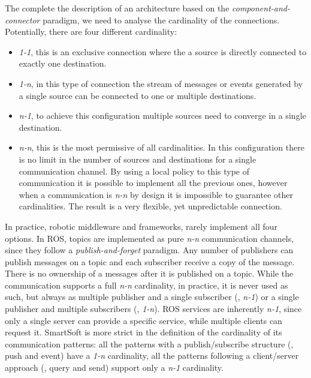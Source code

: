 The complete the description of an architecture based on the \textit{component-and-connector} paradigm, we need to analyse the cardinality of the connections. Potentially, there are four different cardinality:
\begin{itemize}
\item \textit{1-1}, this is an exclusive connection where the a source is directly connected to exactly one destination.
\item \textit{1-n}, in this type of connection the stream of messages or events generated by a single source can be connected to one or multiple destinations.
\item \textit{n-1}, to achieve this configuration multiple sources need to converge in a single destination.
\item \textit{n-n}, this is the most permissive of all cardinalities. In this configuration there is no limit in the number of sources and destinations for a single communication channel. By using a local policy to this type of communication it is possible to implement all the previous ones, however when a communication is \textit{n-n} by design it is impossible to guarantee other cardinalities. The result is a very flexible, yet unpredictable connection.
\end{itemize}
In practice, robotic middleware and frameworks, rarely implement all four options. In ROS, topics are implemented as pure \textit{n-n} communication channels, since they follow a \textit{publish-and-forget} paradigm. Any number of publishers can publish messages on a topic and each subscriber receive a copy of the message. There is no ownership of a messages after it is published on a topic. While the communication supports a full \textit{n-n} cardinality, in practice, it is never used as such, but always as multiple publisher and a single subscriber (\ie, \textit{n-1}) or a single publisher and multiple subscribers (\ie, \textit{1-n}). ROS services are inherently \textit{n-1}, since only a single server can provide a specific service, while multiple clients can request it. SmartSoft is more strict in the definition of the cardinality of its communication patterns: all the patterns with a publish/subscribe structure (\ie, push and event) have a \textit{1-n} cardinality, all the patterns following a client/server approach (\ie, query and send) support only a \textit{n-1} cardinality.

